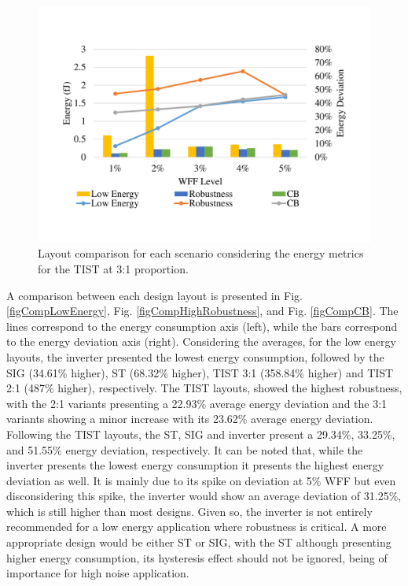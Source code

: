 \documentclass[pgmicro,mestrado,english]{iiufrgs}
\begin{document}
    \begin{figure}[]
        \centering
            \includegraphics[width=1\textwidth, trim={1.25cm 3cm 2cm 3cm}, clip]{comp3Ltist312Energy.pdf}
            \caption{Layout comparison for each scenario considering the energy metrics for the TIST at 3:1 proportion.}
        \label{figscCompTIST31}
    \end{figure}

    A comparison between each design layout is presented in Fig. \ref{figCompLowEnergy}, Fig. \ref{figCompHighRobustness}, and Fig. \ref{figCompCB}. The lines correspond to the energy consumption axis (left), while the bars correspond to the energy deviation axis (right). Considering the averages, for the low energy layouts, the inverter presented the lowest energy consumption, followed by the SIG (34.61\% higher), ST (68.32\% higher), TIST 3:1 (358.84\% higher) and TIST 2:1 (487\% higher), respectively. The TIST layouts, showed the highest robustness, with the 2:1 variants presenting a 22.93\% average energy deviation and the 3:1 variants showing a minor increase with its 23.62\% average energy deviation. Following the TIST layouts, the ST, SIG and inverter present a 29.34\%, 33.25\%, and 51.55\% energy deviation, respectively. It can be noted that, while the inverter presents the lowest energy consumption it presents the highest energy deviation as well. It is mainly due to its spike on deviation at 5\% WFF but even disconsidering this spike, the inverter would show an average deviation of 31.25\%, which is still higher than most designs. Given so, the inverter is not entirely recommended for a low energy application where robustness is critical. A more appropriate design would be either ST or SIG, with the ST although presenting higher energy consumption, its hysteresis effect should not be ignored, being of importance for high noise application.
    
\end{document}
